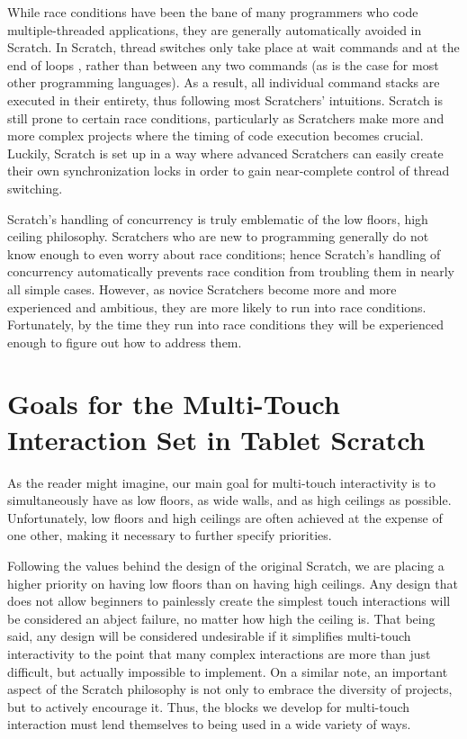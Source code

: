 While race conditions have been the bane of many programmers who code multiple-threaded applications, they are generally automatically avoided in Scratch. In Scratch, thread switches only take place at wait commands and at the end of loops \cite{Maloney}, rather than between any two commands (as is the case for most other programming languages). As a result, all individual command stacks are executed in their entirety, thus following most Scratchers' intuitions. Scratch is still prone to certain race conditions, particularly as Scratchers make more and more complex projects where the timing of code execution becomes crucial. Luckily, Scratch is set up in a way where advanced Scratchers can easily create their own synchronization locks in order to gain near-complete control of thread switching.

Scratch's handling of concurrency is truly emblematic of the low floors, high ceiling philosophy. Scratchers who are new to programming generally do not know enough to even worry about race conditions; hence Scratch's handling of concurrency automatically prevents race condition from troubling them in nearly all simple cases. However, as  novice Scratchers become more and more experienced and ambitious, they are more likely to run into race conditions. Fortunately, by the time they run into race conditions they will be experienced enough to figure out how to address them.

\section{Goals for the Multi-Touch Interaction Set in Tablet Scratch}
As the reader might imagine, our main goal for multi-touch interactivity is to simultaneously have as low floors, as wide walls, and as high ceilings as possible. Unfortunately, low floors and high ceilings are often achieved at the expense of one other, making it necessary to further specify priorities. 

Following the values behind the design of the original Scratch, we are placing a higher priority on having low floors than on having high ceilings. Any design that does not allow beginners to painlessly create the simplest touch interactions will be considered an abject failure, no matter how high the ceiling is. That being said, any design will be considered undesirable if it simplifies multi-touch interactivity to the point that many complex interactions are more than just difficult, but actually impossible to implement. On a similar note, an important aspect of the Scratch philosophy is not only to embrace the diversity of projects, but to actively encourage it. Thus, the blocks we develop for multi-touch interaction must lend themselves to being used in a wide variety of ways.

